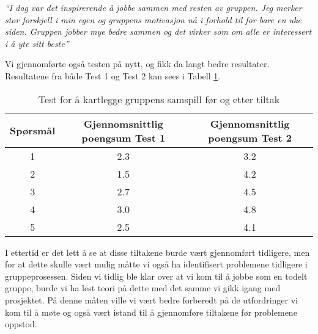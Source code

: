 \emph{``I dag var det inspirerende å jobbe sammen med resten av gruppen. Jeg merker stor forskjell i min egen og gruppens motivasjon nå i forhold til for bare en uke siden. Gruppen jobber mye bedre sammen og det virker som om alle er interessert i å yte sitt beste''}\newline

Vi gjennomførte også testen på nytt, og fikk da langt bedre resultater. Resultatene fra både Test 1 og Test 2 kan sees i Tabell \ref{Test}. \newline

\begin{table}[h]
\begin{center}
\begin{tabular}{| c | c | c | }
\hline
Spørsmål & Gjennomsnittlig poengsum Test 1 & Gjennomsnittlig poengsum Test 2 \\ \hline
1 & 2.3 & 3.2 \\ \hline
2 & 1.5 & 4.2 \\ \hline
3 & 2.7 & 4.5 \\ \hline
4 & 3.0 & 4.8 \\ \hline
5 & 2.5 & 4.1 \\ \hline
\end{tabular}
\caption{Test for å kartlegge gruppens samspill før og etter tiltak}
\label{Test}
\end{center}
\end{table}

I ettertid er det lett å se at disse tiltakene burde vært gjennomført tidligere, men for at dette skulle vært mulig måtte vi også ha identifisert problemene tidligere i gruppeprosessen. Siden vi tidlig ble klar over at vi kom til å jobbe som en todelt gruppe, burde vi ha lest teori på dette med det samme vi gikk igang med prosjektet. På denne måten ville vi vært bedre forberedt på de utfordringer vi kom til å møte og også vært istand til å gjennomføre tiltakene før problemene oppstod.



